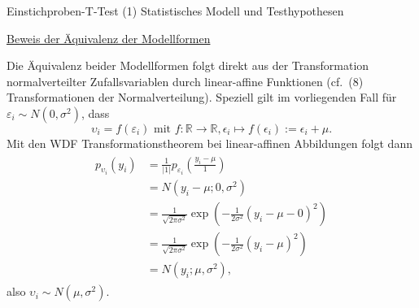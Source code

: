 \documentclass[
  8pt,
  ignorenonframetext,
]{beamer}
\newcommand{\ups} {\upsilon}
\begin{document}
\begin{frame}{Einstichproben-T-Test \textbar{} (1) Statistisches Modell
und Testhypothesen}
\protect\hypertarget{einstichproben-t-test-1-statistisches-modell-und-testhypothesen}{}
\footnotesize

\underline{Beweis der Äquivalenz der Modellformen}

Die Äquivalenz beider Modellformen folgt direkt aus der Transformation
normalverteilter Zufallsvariablen durch linear-affine Funktionen
(cf.~(8) Transformationen der Normalverteilung). Speziell gilt im
vorliegenden Fall für \(\varepsilon_i \sim N(0,\sigma^2)\), dass
\begin{equation}
\ups_i = f(\varepsilon_i)
\mbox{ mit }
f : \mathbb{R} \to \mathbb{R}, \epsilon_i \mapsto f(\epsilon_i) := \epsilon_i + \mu.
\end{equation} Mit den WDF Transformationstheorem bei linear-affinen
Abbildungen folgt dann \begin{align}
\begin{split}
p_{\ups_i}(y_i)
& = \frac{1}{|1|} p_{\varepsilon_i}\left(\frac{y_i - \mu}{1} \right)                        \\
& = N\left(y_i - \mu; 0, \sigma^2\right)                                                    \\
& = \frac{1}{\sqrt{2\pi\sigma^2}}\exp\left(-\frac{1}{2\sigma^2}(y_i - \mu - 0)^2 \right)    \\
& = \frac{1}{\sqrt{2\pi\sigma^2}}\exp\left(-\frac{1}{2\sigma^2}(y_i - \mu)^2 \right)        \\
& = N(y_i; \mu,\sigma^2),
\end{split}
\end{align} also \(\ups_i \sim N(\mu,\sigma^2)\).
\end{frame}
\end{document}

